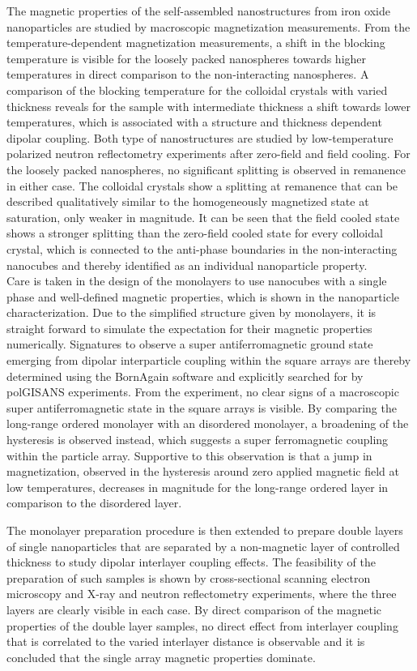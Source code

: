 \documentclass[\main/dresen_thesis.tex]{subfiles}
\begin{document}
  The magnetic properties of the self-assembled nanostructures from iron oxide nanoparticles are studied by macroscopic magnetization measurements.
  From the temperature-dependent magnetization measurements, a shift in the blocking temperature is visible for the loosely packed nanospheres towards higher temperatures in direct comparison to the non-interacting nanospheres.
  A comparison of the blocking temperature for the colloidal crystals with varied thickness reveals for the sample with intermediate thickness a shift towards lower temperatures, which is associated with a structure and thickness dependent dipolar coupling.
  Both type of nanostructures are studied by low-temperature polarized neutron reflectometry experiments after zero-field and field cooling.
  For the loosely packed nanospheres, no significant splitting is observed in remanence in either case.
  The colloidal crystals show a splitting at remanence that can be described qualitatively similar to the homogeneously magnetized state at saturation, only weaker in magnitude.
  It can be seen that the field cooled state shows a stronger splitting than the zero-field cooled state for every colloidal crystal, which is connected to the anti-phase boundaries in the non-interacting nanocubes and thereby identified as an individual nanoparticle property.
  \\

  Care is taken in the design of the monolayers to use nanocubes with a single phase and well-defined magnetic properties, which is shown in the nanoparticle characterization.
  Due to the simplified structure given by monolayers, it is straight forward to simulate the expectation for their magnetic properties numerically.
  Signatures to observe a super antiferromagnetic ground state emerging from dipolar interparticle coupling within the square arrays are thereby determined using the BornAgain software and explicitly searched for by polGISANS experiments.
  From the experiment, no clear signs of a macroscopic super antiferromagnetic state in the square arrays is visible.
  By comparing the long-range ordered monolayer with an disordered monolayer, a broadening of the hysteresis is observed instead, which suggests a super ferromagnetic coupling within the particle array.
  Supportive to this observation is that a jump in magnetization, observed in the hysteresis around zero applied magnetic field at low temperatures, decreases in magnitude for the long-range ordered layer in comparison to the disordered layer.

  The monolayer preparation procedure is then extended to prepare double layers of single nanoparticles that are separated by a non-magnetic layer of controlled thickness to study dipolar interlayer coupling effects.
  The feasibility of the preparation of such samples is shown by cross-sectional scanning electron microscopy and X-ray and neutron reflectometry experiments, where the three layers are clearly visible in each case.
  By direct comparison of the magnetic properties of the double layer samples, no direct effect from interlayer coupling that is correlated to the varied interlayer distance is observable and it is concluded that the single array magnetic properties dominate.
  \\
\end{document}
